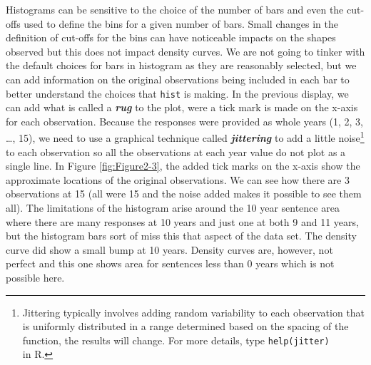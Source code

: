 \documentclass[]{book}
\newenvironment{Shaded}{\begin{snugshade}}{\end{snugshade}}
\newcommand{\KeywordTok}[1]{\textcolor[rgb]{0.13,0.29,0.53}{\textbf{{#1}}}}
\newcommand{\DataTypeTok}[1]{\textcolor[rgb]{0.13,0.29,0.53}{{#1}}}
\newcommand{\DecValTok}[1]{\textcolor[rgb]{0.00,0.00,0.81}{{#1}}}
\newcommand{\StringTok}[1]{\textcolor[rgb]{0.31,0.60,0.02}{{#1}}}
\newcommand{\NormalTok}[1]{{#1}}
\let\rmarkdownfootnote\footnote%
\def\footnote{\protect\rmarkdownfootnote}
\begin{document}
Histograms can be sensitive to the choice of the number of bars and even
the cut-offs used to define the bins for a given number of bars. Small
changes in the definition of cut-offs for the bins can have noticeable
impacts on the shapes observed but this does not impact density curves.
We are not going to tinker with the default choices for bars in
histogram as they are reasonably selected, but we can add information on
the original observations being included in each bar to better
understand the choices that \texttt{hist} is making. In the previous
display, we can add what is called a \textbf{\emph{rug}} to the plot,
were a tick mark is made on the x-axis for each observation. Because the
responses were provided as whole years (1, 2, 3, \ldots{}, 15), we need
to use a graphical technique called \textbf{\emph{jittering}} to add a
little noise\footnote{Jittering typically involves adding random
  variability to each observation that is uniformly distributed in a
  range determined based on the spacing of the function, the results
  will change. For more details, type \texttt{help(jitter)}\\
  in R.} to each observation so all the observations at each year value
do not plot as a single line. In Figure \ref{fig:Figure2-3}, the added
tick marks on the x-axis show the approximate locations of the original
observations. We can see how there are 3 observations at 15 (all were 15
and the noise added makes it possible to see them all). The limitations
of the histogram arise around the 10 year sentence area where there are
many responses at 10 years and just one at both 9 and 11 years, but the
histogram bars sort of miss this that aspect of the data set. The
density curve did show a small bump at 10 years. Density curves are,
however, not perfect and this one shows area for sentences less than 0
years which is not possible here.




\begin{Shaded}
\end{Shaded}
\end{document}
